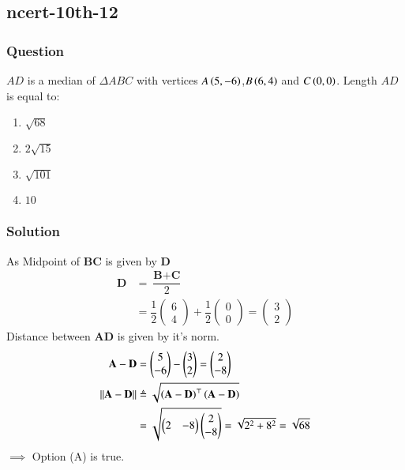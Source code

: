 \documentclass[journal,12pt,onecolumn]{IEEEtran}
\theoremstyle{remark}
\begin{document}
\subsection{ncert-10th-12}
\subsubsection{Question}
$AD$ is a median of $\Delta ABC$ with vertices $A\left(5,-6\right)$,$B\left(6,4\right)$ and $C\left(0,0\right)$. Length $AD$ is equal to:
\begin{enumerate}
\item $\sqrt{68}$
\item $2\sqrt{15}$
\item $\sqrt{101}$
\item $10$
\end{enumerate}
\subsubsection{Solution}
As Midpoint of $\textbf{BC}$ is given by $\textbf{D}$
\begin{align}
    \textbf{D} &= \dfrac{\textbf{B} + \textbf{C}}{2}\\
    &=\dfrac{1}{2}\begin{pmatrix}
        6\\
        4
    \end{pmatrix}
    +
   \dfrac{1}{2} \begin{pmatrix}
        0\\
        0
    \end{pmatrix} = \begin{pmatrix}
        3\\
        2
    \end{pmatrix}
\end{align}
Distance between $\textbf{AD}$ is given by it's norm.
\begin{align}
\textbf{A}-\textbf{D} &= \begin{pmatrix}
        5\\
        -6
    \end{pmatrix}-\begin{pmatrix}
        3\\
        2
    \end{pmatrix}=
    \begin{pmatrix}
        2\\
        -8
    \end{pmatrix}
\\    \lvert\lvert \textbf{A}-\textbf{D} \rvert\rvert &\triangleq \sqrt{\left(\textbf{A}-\textbf{D}\right)^\top\left(\textbf{A}-\textbf{D}\right)} \label{9}\\
    &= \sqrt{\begin{pmatrix}
        2 & -8 
    \end{pmatrix}
    \begin{pmatrix}
        2\\
        -8
    \end{pmatrix}}
    = \sqrt{2^2+8^2} =\sqrt{68} 
\end{align}
$\implies$ Option (A) is true.
\end{document}
